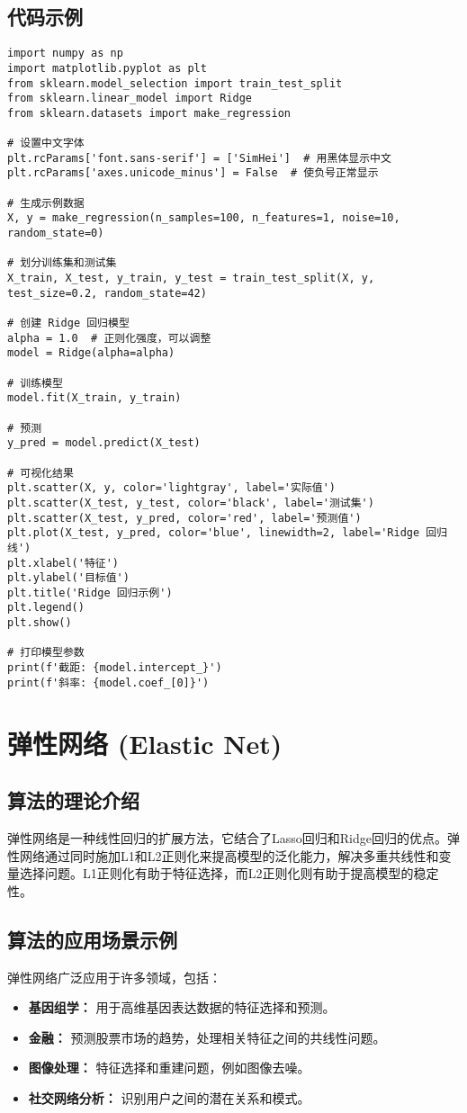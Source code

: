 \subsection*{代码示例}
\begin{lstlisting}
import numpy as np
import matplotlib.pyplot as plt
from sklearn.model_selection import train_test_split
from sklearn.linear_model import Ridge
from sklearn.datasets import make_regression

# 设置中文字体
plt.rcParams['font.sans-serif'] = ['SimHei']  # 用黑体显示中文
plt.rcParams['axes.unicode_minus'] = False  # 使负号正常显示

# 生成示例数据
X, y = make_regression(n_samples=100, n_features=1, noise=10, random_state=0)

# 划分训练集和测试集
X_train, X_test, y_train, y_test = train_test_split(X, y, test_size=0.2, random_state=42)

# 创建 Ridge 回归模型
alpha = 1.0  # 正则化强度，可以调整
model = Ridge(alpha=alpha)

# 训练模型
model.fit(X_train, y_train)

# 预测
y_pred = model.predict(X_test)

# 可视化结果
plt.scatter(X, y, color='lightgray', label='实际值')
plt.scatter(X_test, y_test, color='black', label='测试集')
plt.scatter(X_test, y_pred, color='red', label='预测值')
plt.plot(X_test, y_pred, color='blue', linewidth=2, label='Ridge 回归线')
plt.xlabel('特征')
plt.ylabel('目标值')
plt.title('Ridge 回归示例')
plt.legend()
plt.show()

# 打印模型参数
print(f'截距: {model.intercept_}')
print(f'斜率: {model.coef_[0]}')

\end{lstlisting}

\section{弹性网络 (Elastic Net)}
\subsection*{算法的理论介绍}
弹性网络是一种线性回归的扩展方法，它结合了Lasso回归和Ridge回归的优点。弹性网络通过同时施加L1和L2正则化来提高模型的泛化能力，解决多重共线性和变量选择问题。L1正则化有助于特征选择，而L2正则化则有助于提高模型的稳定性。

\subsection*{算法的应用场景示例}
弹性网络广泛应用于许多领域，包括：
\begin{itemize}
    \item \textbf{基因组学：} 用于高维基因表达数据的特征选择和预测。
    \item \textbf{金融：} 预测股票市场的趋势，处理相关特征之间的共线性问题。
    \item \textbf{图像处理：} 特征选择和重建问题，例如图像去噪。
    \item \textbf{社交网络分析：} 识别用户之间的潜在关系和模式。
\end{itemize}

